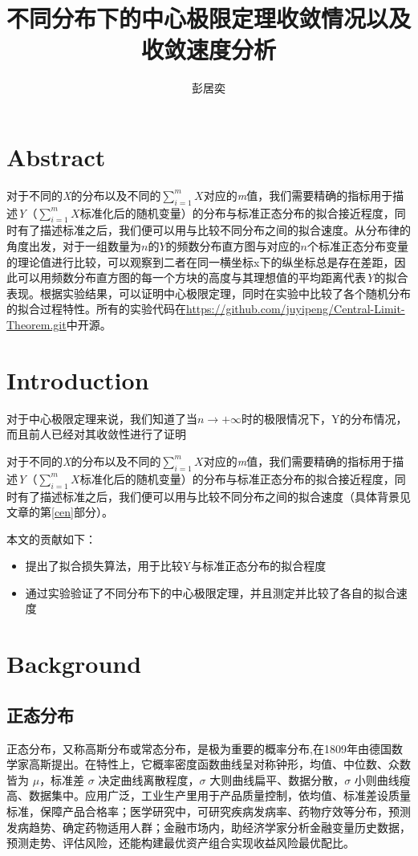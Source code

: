 \documentclass{article}
\title{不同分布下的中心极限定理收敛情况以及收敛速度分析}
\author{彭居奕}
\begin{document}
\maketitle
\section{Abstract}
对于不同的\textit{X}的分布以及不同的$\sum_{i=1}^{m}X$对应的\textit{m}值，我们需要精确的指标用于描述\textit{Y}（$\sum_{i=1}^{m}X$标准化后的随机变量）的分布与标准正态分布的拟合接近程度，同时有了描述标准之后，我们便可以用与比较不同分布之间的拟合速度。从分布律的角度出发，对于一组数量为$n$的$Y$的频数分布直方图与对应的$n$个标准正态分布变量的理论值进行比较，可以观察到二者在同一横坐标x下的纵坐标总是存在差距，因此可以用频数分布直方图的每一个方块的高度与其理想值的平均距离代表\textit{Y}的拟合表现。根据实验结果，可以证明中心极限定理，同时在实验中比较了各个随机分布的拟合过程特性。所有的实验代码在\url{https://github.com/juyipeng/Central-Limit-Theorem.git}中开源。
\section{Introduction}

对于中心极限定理\cite{laplace}来说，我们知道了当$n\to+\infty$时的极限情况下，Y的分布情况，而且前人已经对其收敛性进行了证明\cite{Liapounov1901}

对于不同的\textit{X}的分布以及不同的$\sum_{i=1}^{m}X$对应的\textit{m}值，我们需要精确的指标用于描述\textit{Y}（$\sum_{i=1}^{m}X$标准化后的随机变量）的分布与标准正态分布的拟合接近程度，同时有了描述标准之后，我们便可以用与比较不同分布之间的拟合速度（具体背景见文章的第\ref{cen}部分）。

本文的贡献如下：
\begin{itemize}
\item 提出了拟合损失算法，用于比较Y与标准正态分布的拟合程度
\item 通过实验验证了不同分布下的中心极限定理，并且测定并比较了各自的拟合速度
\end{itemize}



\section{Background}

\subsection{正态分布}
正态分布\cite{gauss}，又称高斯分布或常态分布，是极为重要的概率分布,在1809年由德国数学家高斯提出。在特性上，它概率密度函数曲线呈对称钟形，均值、中位数、众数皆为 $\mu$，标准差 $\sigma$ 决定曲线离散程度，$\sigma$ 大则曲线扁平、数据分散，$\sigma$ 小则曲线瘦高、数据集中。应用广泛，工业生产里用于产品质量控制，依均值、标准差设质量标准，保障产品合格率；医学研究中，可研究疾病发病率、药物疗效等分布，预测发病趋势、确定药物适用人群；金融市场内，助经济学家分析金融变量历史数据，预测走势、评估风险，还能构建最优资产组合实现收益风险最优配比。
\end{document}
